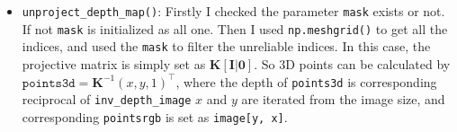 \begin{itemize}
    \item \texttt{unproject\_depth\_map()}: Firstly I checked the parameter \texttt{mask} exists or not. If not \texttt{mask} is initialized as all one. Then I used \texttt{np.meshgrid()} to get all the indices, and used the \texttt{mask} to filter the unreliable indices. In this case, the projective matrix is simply set as $\textbf{K}[\textbf{I}|\textbf{0}]$. So 3D points can be calculated by $\texttt{points3d} = \textbf{K}^{-1}(x, y, 1)^\intercal$, where the depth of \texttt{points3d} is corresponding reciprocal of \texttt{inv\_depth\_image}  $x$ and $y$ are iterated from the image size, and corresponding \texttt{pointsrgb} is set as \texttt{image[y, x]}. 

\end{itemize}




